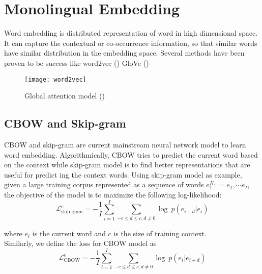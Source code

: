 \section{Monolingual Embedding}
Word embedding is distributed representation of word in high dimensional space. It can capture the contextual or co-occurrence information, so that similar words have similar distribution in the embedding space.  Several methods have been proven to be success like word2vec (\cite{mikolov2013efficient}) GloVe (\cite{pennington2014glove})
\begin{figure}[h]
	\texttt{[image: word2vec]}
	\caption{Global attention model (\cite{mikolov2013efficient})}
	\centering
\end{figure}
\subsection{CBOW and Skip-gram}
CBOW and skip-gram are current mainstream neural network model to learn word embedding. Algorithmically,  CBOW tries to predict the current word based on the context while skip-gram model is to find better representations that are useful for predict \cite{qi2018and}ing the context words. Using skip-gram model as example, given a large training corpus represented as a sequence of words ${e_1^N: = e_1, \cdots e_I}$, the objective of the model is to maximize the following log-likelihood:
\[ \mathcal{L}^e_{\text{skip-gram}} = - \frac{1}{I} \sum_{i=1}^{I} \sum_{ -c \le d \le c, d\ne 0} \log\ {p(e_{i+d}|e_i)}\]

where $e_i$ is the current word and $c$ is the size of training context. \\


Similarly, we define the loss for CBOW model as
\[ \mathcal{L}^e_{\text{CBOW}} = - \frac{1}{I} \sum_{i=1}^{I} \sum_{ -c \le d \le c, d\ne 0} \log\ {p(e_{i}|e_{i+d})}\]


